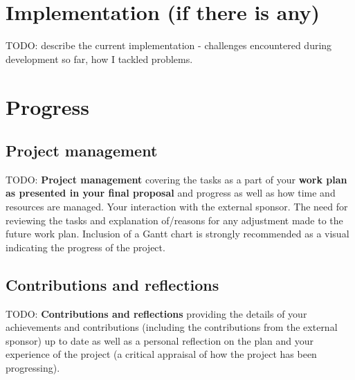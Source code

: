\documentclass{article}
\begin{document}
\section{Implementation (if there is any)}
TODO: describe the current implementation - challenges encountered during
development so far, how I tackled problems.


\section{Progress}
\subsection{Project management}
TODO: \textbf{Project management} covering the tasks as a part of your
\textbf{work plan as presented in your final proposal} and progress as well as
how time and resources are managed. Your interaction with the external sponsor.
The need for reviewing the tasks and explanation of/reasons for any adjustment
made to the future work plan. Inclusion of a Gantt chart is strongly
recommended as a visual indicating the progress of the project.


\subsection{Contributions and reflections}
TODO: \textbf{Contributions and reflections} providing the details of your
achievements and contributions (including the contributions from the external
sponsor) up to date as well as a personal reflection on the plan and your
experience of the project (a critical appraisal of how the project has been
progressing).

\printglossaries

\nocite{design-of-unix-os}
\nocite{osdev-wiki}
\nocite{unix-prog-env}
\printbibliography
\end{document}
